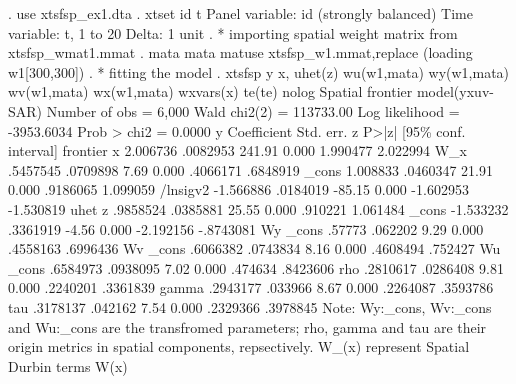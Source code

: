 . use xtsfsp_ex1.dta
{\smallskip}
. xtset id t 
{\smallskip}
Panel variable: id (strongly balanced)
 Time variable: t, 1 to 20
         Delta: 1 unit
{\smallskip}
. * importing spatial weight matrix from xtsfsp_wmat1.mmat
. mata mata matuse xtsfsp_w1.mmat,replace
(loading w1[300,300])
{\smallskip}
. * fitting the model
. xtsfsp y x, uhet(z) wu(w1,mata) wy(w1,mata) wv(w1,mata) wx(w1,mata) wxvars(x) te(te) nolog
{\smallskip}
Spatial frontier model(yxuv-SAR)                     Number of obs =     6,000
                                                     Wald chi2(2)  = 113733.00
Log likelihood = -3953.6034                          Prob > chi2   =    0.0000
{\smallskip}
           y {\VBAR} Coefficient  Std. err.      z    P>|z|     [95\% conf. interval]
frontier     {\VBAR}
           x {\VBAR}   2.006736   .0082953   241.91   0.000     1.990477    2.022994
         W_x {\VBAR}   .5457545   .0709898     7.69   0.000     .4066171    .6848919
       _cons {\VBAR}   1.008833   .0460347    21.91   0.000     .9186065    1.099059
    /lnsigv2 {\VBAR}  -1.566886   .0184019   -85.15   0.000    -1.602953   -1.530819
uhet         {\VBAR}
           z {\VBAR}   .9858524   .0385881    25.55   0.000      .910221    1.061484
       _cons {\VBAR}  -1.533232   .3361919    -4.56   0.000    -2.192156   -.8743081
Wy           {\VBAR}
       _cons {\VBAR}     .57773    .062202     9.29   0.000     .4558163    .6996436
Wv           {\VBAR}
       _cons {\VBAR}   .6066382   .0743834     8.16   0.000     .4608494     .752427
Wu           {\VBAR}
       _cons {\VBAR}   .6584973   .0938095     7.02   0.000      .474634    .8423606
         rho {\VBAR}   .2810617   .0286408     9.81   0.000     .2240201    .3361839
       gamma {\VBAR}   .2943177    .033966     8.67   0.000     .2264087    .3593786
         tau {\VBAR}   .3178137    .042162     7.54   0.000     .2329366    .3978845
Note: Wy:_cons, Wv:_cons and Wu:_cons are the transfromed parameters;
      rho, gamma and tau are their origin metrics in spatial components, repsectively.
      W_(x) represent Spatial Durbin terms W(x)
